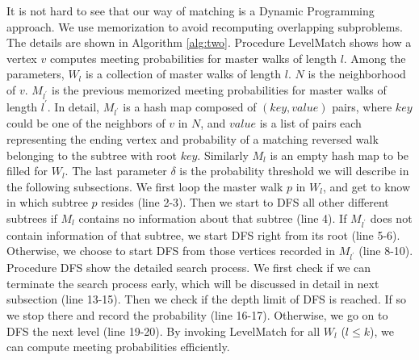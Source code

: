 \documentclass[conference]{IEEEtran}
\theoremstyle{definition}
\theoremstyle{definition}
\begin{document}
It is not hard to see that our way of matching is a Dynamic Programming approach. 
We use memorization to avoid recomputing overlapping subproblems.
The details are shown in Algorithm \ref{alg:two}.
Procedure LevelMatch shows how a vertex $v$ computes meeting probabilities for master walks of length $l$.
Among the  parameters,
 $W_l$  is a collection of master walks of length $l$.
  $N$ is the neighborhood of $v$.
 $M_{l^\prime}$ is the previous memorized meeting probabilities for master walks of length $l^\prime$.
 In detail, $M_{l^\prime}$ is a hash map composed of $(key, value)$ pairs, where $key$ could be one of  the neighbors of $v$ in $N$,  and $value$ is a list of pairs each representing the ending vertex and probability of a matching reversed walk  belonging to the subtree with root $key$.
 Similarly $M_l$ is an empty hash map to be filled for $W_l$.
 The last parameter $\delta$ is the probability threshold we will describe in the following subsections.
We first loop the master walk $p$ in $W_l$, and get to know  in which subtree $p$ resides (line 2-3).
Then we start to DFS all other different subtrees if $M_l$ contains no information about that subtree (line 4).
If $M_{l^\prime}$ does not contain information of that subtree, we start DFS right from its root (line 5-6).
Otherwise, we choose to start DFS from those vertices recorded in $M_{l^\prime}$ (line 8-10).
Procedure DFS show the detailed search process. 
We first check if we can terminate the search process early, which will be discussed in detail in next subsection (line 13-15).
Then we check if the depth limit of DFS is reached. If so we stop there and record the probability (line 16-17).
Otherwise, we go on to DFS the next level (line 19-20).
By invoking LevelMatch for all $W_l$ ($l \leq k$), we can compute meeting probabilities  efficiently.
\end{document}
